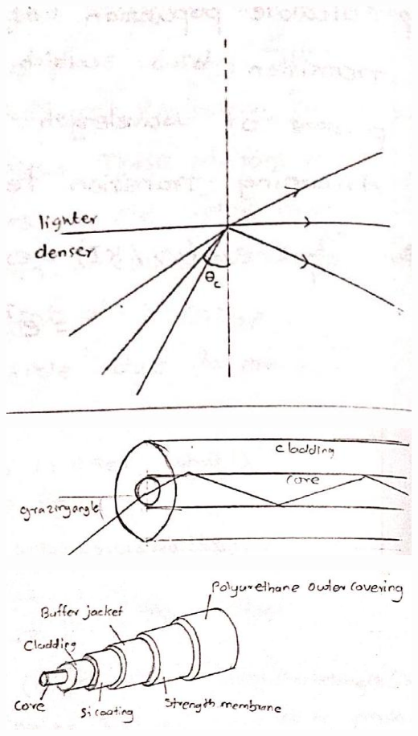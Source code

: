 \documentclass[12pt, a4paper]{article}
\begin{document}
\begin{minipage}[t][][b]{.4\textwidth}%
	\includegraphics[max width=\textwidth]{2024_06_16_30d750483617f1939202g-05(3)}

	\includegraphics[max width=\textwidth]{2024_06_16_30d750483617f1939202g-05}
\end{minipage}


\begin{center}
	\includegraphics[max width=\textwidth]{2024_06_16_30d750483617f1939202g-05(2)}
\end{center}
\end{document}
